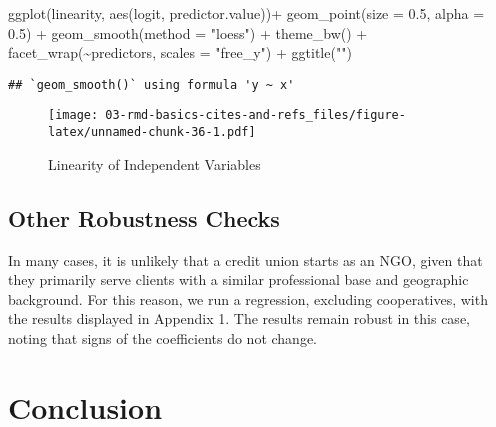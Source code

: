 \documentclass[a4paper,nobind]{templates/ociamthesis}
\newenvironment{Shaded}{\begin{snugshade}}{\end{snugshade}}
\newcommand{\AttributeTok}[1]{\textcolor[rgb]{0.77,0.63,0.00}{#1}}
\newcommand{\FloatTok}[1]{\textcolor[rgb]{0.00,0.00,0.81}{#1}}
\newcommand{\FunctionTok}[1]{\textcolor[rgb]{0.00,0.00,0.00}{#1}}
\newcommand{\NormalTok}[1]{#1}
\newcommand{\SpecialCharTok}[1]{\textcolor[rgb]{0.00,0.00,0.00}{#1}}
\newcommand{\StringTok}[1]{\textcolor[rgb]{0.31,0.60,0.02}{#1}}
\renewenvironment{Shaded}
{
  \vspace{10pt}%
  \begin{snugshade}%
}{%
  \end{snugshade}%
  \vspace{8pt}%
}
\begin{document}
\begin{landscape}
\begin{Shaded}
\begin{Highlighting}[]
\FunctionTok{ggplot}\NormalTok{(linearity, }\FunctionTok{aes}\NormalTok{(logit, predictor.value))}\SpecialCharTok{+}
  \FunctionTok{geom\_point}\NormalTok{(}\AttributeTok{size =} \FloatTok{0.5}\NormalTok{, }\AttributeTok{alpha =} \FloatTok{0.5}\NormalTok{) }\SpecialCharTok{+}
  \FunctionTok{geom\_smooth}\NormalTok{(}\AttributeTok{method =} \StringTok{"loess"}\NormalTok{) }\SpecialCharTok{+} 
  \FunctionTok{theme\_bw}\NormalTok{() }\SpecialCharTok{+} 
  \FunctionTok{facet\_wrap}\NormalTok{(}\SpecialCharTok{\textasciitilde{}}\NormalTok{predictors, }\AttributeTok{scales =} \StringTok{"free\_y"}\NormalTok{) }\SpecialCharTok{+} 
  \FunctionTok{ggtitle}\NormalTok{(}\StringTok{""}\NormalTok{)}
\end{Highlighting}
\end{Shaded}

\begin{verbatim}
## `geom_smooth()` using formula 'y ~ x'
\end{verbatim}

\begin{figure}
\centering
\texttt{[image: 03-rmd-basics-cites-and-refs\_files/figure-latex/unnamed-chunk-36-1.pdf]}
\caption{\label{fig:unnamed-chunk-36}Linearity of Independent Variables}
\end{figure}

\end{landscape}

\hypertarget{other-robustness-checks}{%
\subsection{Other Robustness Checks}\label{other-robustness-checks}}

In many cases, it is unlikely that a credit union starts as an NGO, given that they primarily serve clients with a similar professional base and geographic background. For this reason, we run a regression, excluding cooperatives, with the results displayed in Appendix 1. The results remain robust in this case, noting that signs of the coefficients do not change.

\hypertarget{conclusion}{%
\section{Conclusion}\label{conclusion}}
\end{document}
